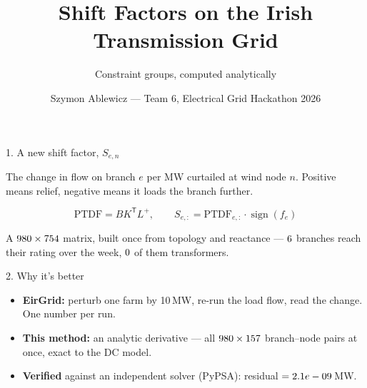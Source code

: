 \documentclass[11pt,aspectratio=169]{beamer}
\title{Shift Factors on the Irish Transmission Grid}
\subtitle{Constraint groups, computed analytically}
\author{Szymon Ablewicz --- Team 6, Electrical Grid Hackathon 2026}
\date{}
\newcommand{\T}{^{\mathsf{T}}}
\newcommand{\Lp}{L^{+}}
\begin{document}
\begin{frame}
\titlepage
\end{frame}

\begin{frame}{1. A new shift factor, $S_{e,n}$}

The change in flow on branch $e$ per MW curtailed at wind node $n$.
Positive means relief, negative means it loads the branch further.

\bigskip
\begin{equation*}
\text{PTDF} = BK\T\Lp, \qquad
S_{e,:} = \text{PTDF}_{e,:}\cdot\operatorname{sign}(f_e)
\end{equation*}

\bigskip
A $980\times754$ matrix, built once from topology and reactance ---
$6$ branches reach their rating over the week, $0$ of them
transformers.

\end{frame}

\begin{frame}{2. Why it's better}

\begin{itemize}
  \item \textbf{EirGrid:} perturb one farm by 10\,MW, re-run the load
        flow, read the change. One number per run.
  \bigskip
  \item \textbf{This method:} an analytic derivative --- all
        $980\times157$ branch--node pairs at once, exact to the DC
        model.
  \bigskip
  \item \textbf{Verified} against an independent solver (PyPSA):
        residual $= 2.1e-09$\,MW.
\end{itemize}

\end{frame}
\end{document}
